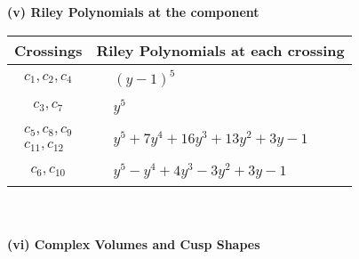 \documentclass[1p]{elsarticle_modified}
\theoremstyle{definition}
\begin{document}
\newpage\renewcommand{\arraystretch}{1}
\flushleft \textbf{(v) Riley Polynomials at the component}\newline \\
\begin{tabular}{m{50pt}|m{274pt}}
Crossings & \hspace{64pt}Riley Polynomials at each crossing \\
\hline $$\begin{aligned}c_{1},c_{2},c_{4}\end{aligned}$$&$\begin{aligned}
&(y-1)^5
\end{aligned}$\\
\hline $$\begin{aligned}c_{3},c_{7}\end{aligned}$$&$\begin{aligned}
&y^5
\end{aligned}$\\
\hline $$\begin{aligned}c_{5},c_{8},c_{9}\\c_{11},c_{12}\end{aligned}$$&$\begin{aligned}
&y^5+7 y^4+16 y^3+13 y^2+3 y-1
\end{aligned}$\\
\hline $$\begin{aligned}c_{6},c_{10}\end{aligned}$$&$\begin{aligned}
&y^5- y^4+4 y^3-3 y^2+3 y-1
\end{aligned}$\\
\hline
\end{tabular}\\~\\
\newpage\flushleft \textbf{(vi) Complex Volumes and Cusp Shapes}
\end{document}
